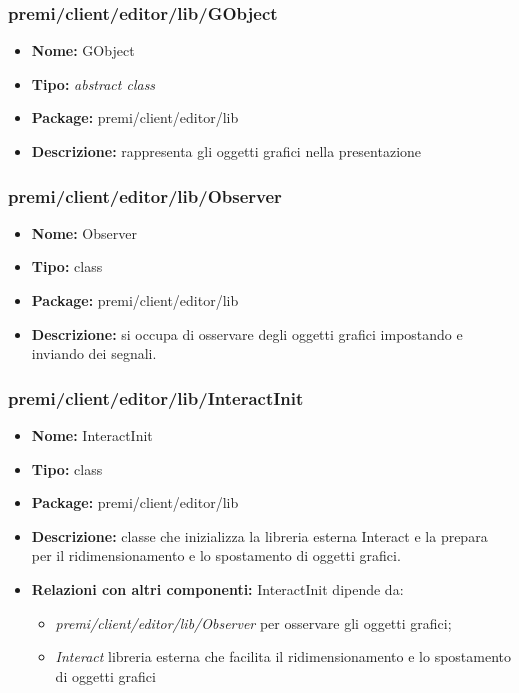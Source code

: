 \subsubsection{premi/client/editor/lib/GObject}
\begin{itemize}
  \item[] \textbf{Nome:} GObject
  \item[] \textbf{Tipo:} \textit{abstract class}
  \item[] \textbf{Package:} premi/client/editor/lib
  \item[] \textbf{Descrizione:} rappresenta gli oggetti grafici nella presentazione
\end{itemize}
\subsubsection{premi/client/editor/lib/Observer}
\begin{itemize}
  \item[] \textbf{Nome:} Observer
  \item[] \textbf{Tipo:} class
  \item[] \textbf{Package:} premi/client/editor/lib
  \item[] \textbf{Descrizione:} si occupa di osservare degli oggetti grafici impostando e inviando dei segnali.
\end{itemize}
\subsubsection{premi/client/editor/lib/InteractInit}
\begin{itemize}
  \item[] \textbf{Nome:} InteractInit
  \item[] \textbf{Tipo:} class
  \item[] \textbf{Package:} premi/client/editor/lib
  \item[] \textbf{Descrizione:} classe che inizializza la libreria esterna Interact e la prepara per il ridimensionamento e lo spostamento di oggetti grafici.
  \item[] \textbf{Relazioni con altri componenti:} InteractInit dipende da:
  \begin{itemize}
  	\item \textit{premi/client/editor/lib/Observer} per osservare gli oggetti grafici;
  	\item \textit{Interact} libreria esterna che facilita il ridimensionamento e lo spostamento di oggetti grafici
  \end{itemize}
\end{itemize}
